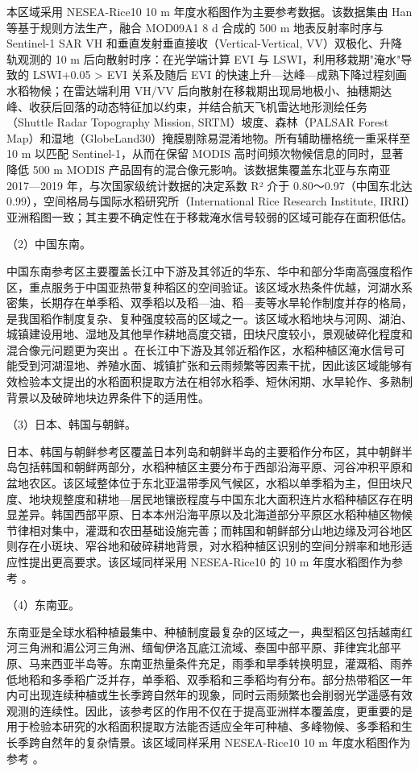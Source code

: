 本区域采用 NESEA-Rice10\cite{Han2021} 10 m 年度水稻图作为主要参考数据。该数据集由 Han 等基于规则方法生产，融合 MOD09A1 8 d 合成的 500 m 地表反射率时序与 Sentinel-1 SAR VH 和垂直发射垂直接收（Vertical-Vertical, VV）双极化、升降轨观测的 10 m 后向散射时序：在光学端计算 EVI 与 LSWI，利用移栽期"淹水"导致的 LSWI+0.05 > EVI 关系及随后 EVI 的快速上升—达峰—成熟下降过程刻画水稻物候；在雷达端利用 VH/VV 后向散射在移栽期出现局地极小、抽穗期达峰、收获后回落的动态特征加以约束，并结合航天飞机雷达地形测绘任务（Shuttle Radar Topography Mission, SRTM）坡度、森林（PALSAR Forest Map）和湿地（GlobeLand30）掩膜剔除易混淆地物。所有辅助栅格统一重采样至 10 m 以匹配 Sentinel-1，从而在保留 MODIS 高时间频次物候信息的同时，显著降低 500 m MODIS 产品固有的混合像元影响。该数据集覆盖东北亚与东南亚 2017—2019 年，与次国家级统计数据的决定系数 R² 介于 0.80～0.97（中国东北达 0.99），空间格局与国际水稻研究所（International Rice Research Institute, IRRI）亚洲稻图一致；其主要不确定性在于移栽淹水信号较弱的区域可能存在面积低估。

\noindent （2）中国东南。

中国东南参考区主要覆盖长江中下游及其邻近的华东、华中和部分华南高强度稻作区，重点服务于中国亚热带复种稻区的空间验证。该区域水热条件优越，河湖水系密集，长期存在单季稻、双季稻以及稻—油、稻—麦等水旱轮作制度并存的格局，是我国稻作制度复杂、复种强度较高的区域之一。该区域水稻地块与河网、湖泊、城镇建设用地、湿地及其他旱作耕地高度交错，田块尺度较小，景观破碎化程度和混合像元问题更为突出 \cite{Xiao2005,Zhang2017STOTEN,Wei2022ChinaPaddy}。在长江中下游及其邻近稻作区，水稻种植区淹水信号可能受到河湖湿地、养殖水面、城镇扩张和云雨频繁等因素干扰，因此该区域能够有效检验本文提出的水稻面积提取方法在相邻水稻季、短休闲期、水旱轮作、多熟制背景以及破碎地块边界条件下的适用性。

\noindent （3）日本、韩国与朝鲜。

日本、韩国与朝鲜参考区覆盖日本列岛和朝鲜半岛的主要稻作分布区，其中朝鲜半岛包括韩国和朝鲜两部分，水稻种植区主要分布于西部沿海平原、河谷冲积平原和盆地农区。该区域整体位于东北亚温带季风气候区，水稻以单季稻为主，但田块尺度、地块规整度和耕地—居民地镶嵌程度与中国东北大面积连片水稻种植区存在明显差异。韩国西部平原、日本本州沿海平原以及北海道部分平原区水稻种植区物候节律相对集中，灌溉和农田基础设施完善；而韩国和朝鲜部分山地边缘及河谷地区则存在小斑块、窄谷地和破碎耕地背景，对水稻种植区识别的空间分辨率和地形适应性提出更高要求。该区域同样采用 NESEA-Rice10 的 10 m 年度水稻图作为参考 \cite{Han2021}。

\noindent （4）东南亚。

东南亚是全球水稻种植最集中、种植制度最复杂的区域之一，典型稻区包括越南红河三角洲和湄公河三角洲、缅甸伊洛瓦底江流域、泰国中部平原、菲律宾北部平原、马来西亚半岛等。东南亚热量条件充足，雨季和旱季转换明显，灌溉稻、雨养低地稻和多季稻广泛并存，单季稻、双季稻和三季稻均有分布。部分热带稻区一年内可出现连续种植或生长季跨自然年的现象，同时云雨频繁也会削弱光学遥感有效观测的连续性\cite{Xiao2006,Sun2023SEAsiaRice20m}。因此，该参考区的作用不仅在于提高亚洲样本覆盖度，更重要的是用于检验本研究的水稻面积提取方法能否适应全年可种植、多峰物候、多季稻和生长季跨自然年的复杂情景。该区域同样采用 NESEA-Rice10 10 m 年度水稻图作为参考 \cite{Han2021}。

